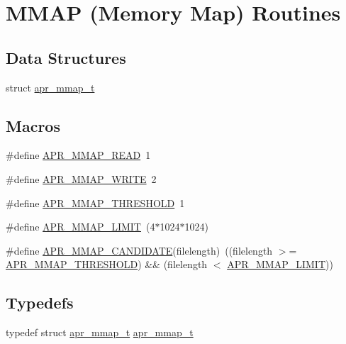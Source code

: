 \hypertarget{group__apr__mmap}{}\section{M\+M\+AP (Memory Map) Routines}
\label{group__apr__mmap}
\subsection*{Data Structures}
\begin{DoxyCompactItemize}
\item 
struct \hyperlink{structapr__mmap__t}{apr\+\_\+mmap\+\_\+t}
\end{DoxyCompactItemize}
\subsection*{Macros}
\begin{DoxyCompactItemize}
\item 
\#define \hyperlink{group__apr__mmap_gac231fdf15d2d29802e0abbc5d0cf25b8}{A\+P\+R\+\_\+\+M\+M\+A\+P\+\_\+\+R\+E\+AD}~1
\item 
\#define \hyperlink{group__apr__mmap_gac2eb7f697d8bf190e630b85f967c8273}{A\+P\+R\+\_\+\+M\+M\+A\+P\+\_\+\+W\+R\+I\+TE}~2
\item 
\#define \hyperlink{group__apr__mmap_ga19d1916e7b64bfb1a969648fe7b0846a}{A\+P\+R\+\_\+\+M\+M\+A\+P\+\_\+\+T\+H\+R\+E\+S\+H\+O\+LD}~1
\item 
\#define \hyperlink{group__apr__mmap_ga548e49b3c9e8265ad8ccf70994f4fe25}{A\+P\+R\+\_\+\+M\+M\+A\+P\+\_\+\+L\+I\+M\+IT}~(4$\ast$1024$\ast$1024)
\item 
\#define \hyperlink{group__apr__mmap_ga4f469432098e986567576fd4c4ce5adc}{A\+P\+R\+\_\+\+M\+M\+A\+P\+\_\+\+C\+A\+N\+D\+I\+D\+A\+TE}(filelength)~((filelength $>$= \hyperlink{group__apr__mmap_ga19d1916e7b64bfb1a969648fe7b0846a}{A\+P\+R\+\_\+\+M\+M\+A\+P\+\_\+\+T\+H\+R\+E\+S\+H\+O\+LD}) \&\& (filelength $<$ \hyperlink{group__apr__mmap_ga548e49b3c9e8265ad8ccf70994f4fe25}{A\+P\+R\+\_\+\+M\+M\+A\+P\+\_\+\+L\+I\+M\+IT}))
\end{DoxyCompactItemize}
\subsection*{Typedefs}
\begin{DoxyCompactItemize}
\item 
typedef struct \hyperlink{structapr__mmap__t}{apr\+\_\+mmap\+\_\+t} \hyperlink{group__apr__mmap_ga766b01a3e1e0438d06dc88d76f826f80}{apr\+\_\+mmap\+\_\+t}
\end{DoxyCompactItemize}

